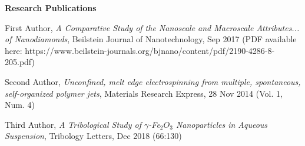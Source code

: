 \documentclass[letterpaper,final]{memoir}
\newcommand{\Sep}{\vspace{1.0em}}
\newcommand{\SmallSep}{\vspace{0.4em}}
\newcommand{\CVSection}[1]
	{\LARGE\textbf{#1}\par
	\SmallSep\normalsize}
\begin{document}

\notoserif \CVSection{Research Publications}
\normalfont

\Sep

\begin{compactitem}[\color{Blue}$\circ$]

    \item First Author, \textit{A Comparative Study of the Nanoscale and Macroscale Attributes... of Nanodiamonds}, Beilstein Journal of Nanotechnology, Sep 2017 (PDF available here: https://www.beilstein-journals.org/bjnano/content/pdf/2190-4286-8-205.pdf)
    \SmallSep

    \item Second Author, \textit{Unconfined, melt edge electrospinning from multiple, spontaneous, self-organized polymer jets}, Materials Research Express, 28 Nov 2014 (Vol. 1, Num. 4)
    \SmallSep

    \item Third Author, \textit{A Tribological Study of $\gamma$-Fe$_{2}O_{3}$ Nanoparticles in Aqueous Suspension}, Tribology Letters, Dec 2018 (66:130)

\end{compactitem}
\end{document}
